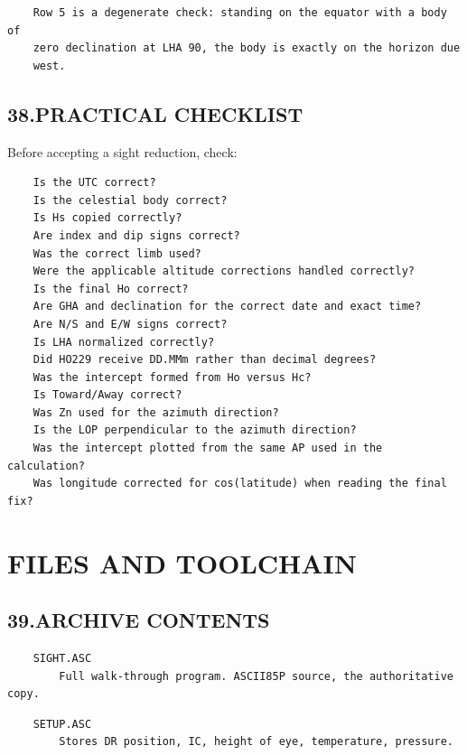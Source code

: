 \documentclass[11pt]{article}
\begin{document}
\begin{verbatim}
    Row 5 is a degenerate check: standing on the equator with a body of
    zero declination at LHA 90, the body is exactly on the horizon due
    west.
\end{verbatim}

\subsection*{38.\quad PRACTICAL CHECKLIST}

Before accepting a sight reduction, check:

\begin{verbatim}
    Is the UTC correct?
    Is the celestial body correct?
    Is Hs copied correctly?
    Are index and dip signs correct?
    Was the correct limb used?
    Were the applicable altitude corrections handled correctly?
    Is the final Ho correct?
    Are GHA and declination for the correct date and exact time?
    Are N/S and E/W signs correct?
    Is LHA normalized correctly?
    Did HO229 receive DD.MMm rather than decimal degrees?
    Was the intercept formed from Ho versus Hc?
    Is Toward/Away correct?
    Was Zn used for the azimuth direction?
    Is the LOP perpendicular to the azimuth direction?
    Was the intercept plotted from the same AP used in the calculation?
    Was longitude corrected for cos(latitude) when reading the final fix?
\end{verbatim}

\section*{FILES AND TOOLCHAIN}

\subsection*{39.\quad ARCHIVE CONTENTS}

\begin{verbatim}
    SIGHT.ASC
        Full walk-through program. ASCII85P source, the authoritative copy.
\end{verbatim}

\begin{verbatim}
    SETUP.ASC
        Stores DR position, IC, height of eye, temperature, pressure.
\end{verbatim}
\end{document}
